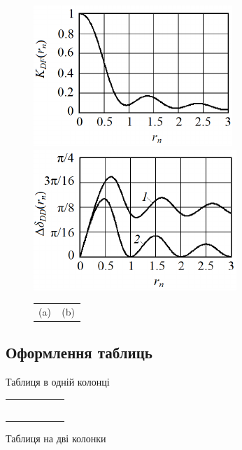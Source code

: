 \begin{multicols}{2}
\begin{figure}\centering
	\includegraphics[width=0.4\linewidth]{fig2a}
	~~~~~
	\includegraphics[width=0.4\linewidth]{fig2b}
	\begin{tabular}{p{0.49\linewidth}p{0.49\linewidth}}
		\centering (a) & \centering (b)  
	\end{tabular}	
	\label{fig2}%
\end{figure}

\subsection{Оформлення таблиць}

Таблиця в одній колонці
\begin{Table}
	\begin{tabularx}{\linewidth}{|l|c|c|c|c|X|}
		\hline   &   &  &  &  &  \\
		\rule{0pt}{10pt}   &   &	 &	  & &	 \\ 
		\hline 
		\rule{0pt}{10pt}  &  &   &	  &	  &  \\ 
		\hline 
		\rule{0pt}{10pt}  &   &	 &	  &	  &	 \\ 
		\hline 
		\rule{0pt}{10pt}  &   &   &	  &	  & \\ 
		\hline 
		\rule{0pt}{10pt}   &	  &  &   &	  &  \\ 
		\hline 
\end{tabularx} \label{radap1725tab1}
\end{Table}

Таблиця на дві колонки
\end{multicols}
